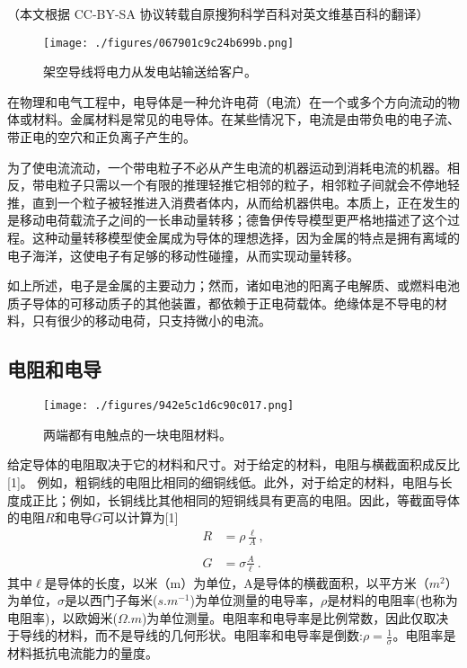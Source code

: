 
（本文根据 CC-BY-SA 协议转载自原搜狗科学百科对英文维基百科的翻译）

\begin{figure}[ht]
\centering
\texttt{[image: ./figures/067901c9c24b699b.png]}
\caption{架空导线将电力从发电站输送给客户。} \label{fig_DDT_3}
\end{figure}

在物理和电气工程中，电导体是一种允许电荷（电流）在一个或多个方向流动的物体或材料。金属材料是常见的电导体。在某些情况下，电流是由带负电的电子流、带正电的空穴和正负离子产生的。

为了使电流流动，一个带电粒子不必从产生电流的机器运动到消耗电流的机器。相反，带电粒子只需以一个有限的推理轻推它相邻的粒子，相邻粒子间就会不停地轻推，直到一个粒子被轻推进入消费者体内，从而给机器供电。本质上，正在发生的是移动电荷载流子之间的一长串动量转移；德鲁伊传导模型更严格地描述了这个过程。这种动量转移模型使金属成为导体的理想选择，因为金属的特点是拥有离域的电子海洋，这使电子有足够的移动性碰撞，从而实现动量转移。

如上所述，电子是金属的主要动力；然而，诸如电池的阳离子电解质、或燃料电池质子导体的可移动质子的其他装置，都依赖于正电荷载体。绝缘体是不导电的材料，只有很少的移动电荷，只支持微小的电流。

\subsection{ 电阻和电导}
\begin{figure}[ht]
\centering
\texttt{[image: ./figures/942e5c1d6c90c017.png]}
\caption{两端都有电触点的一块电阻材料。} \label{fig_DDT_1}
\end{figure}
给定导体的电阻取决于它的材料和尺寸。对于给定的材料，电阻与横截面积成反比[1]。 例如，粗铜线的电阻比相同的细铜线低。此外，对于给定的材料，电阻与长度成正比；例如，长铜线比其他相同的短铜线具有更高的电阻。因此，等截面导体的电阻$R$和电导$G$可以计算为[1]
\begin{equation}
\begin{aligned}
R &= \rho \frac{\ell}{A}, \\\\
G &= \sigma \frac{A}{\ell}~.
\end{aligned}
\end{equation}
其中$\ell$是导体的长度，以米（m）为单位，A是导体的横截面积，以平方米（$m^2$）为单位，$\sigma$是以西门子每米($s.m^{-1}$)为单位测量的电导率，$\rho$是材料的电阻率(也称为电阻率)，以欧姆米($\Omega.m$)为单位测量。电阻率和电导率是比例常数，因此仅取决于导线的材料，而不是导线的几何形状。电阻率和电导率是倒数:$\rho = \frac{1}{\sigma}$。电阻率是材料抵抗电流能力的量度。

